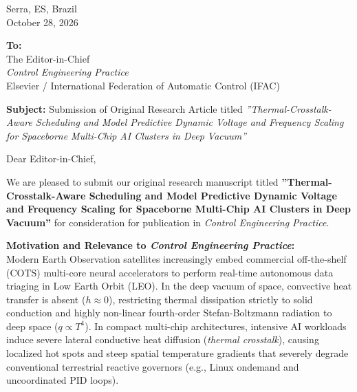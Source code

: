 \documentclass[11pt,a4paper]{article}
\begin{document}
\begin{flushright}
Serra, ES, Brazil \\
October 28, 2026
\end{flushright}

\textbf{To:} \\
The Editor-in-Chief \\
\textit{Control Engineering Practice} \\
Elsevier / International Federation of Automatic Control (IFAC)

\vspace{0.4cm}
\textbf{Subject:} Submission of Original Research Article titled \textit{''Thermal-Crosstalk-Aware Scheduling and Model Predictive Dynamic Voltage and Frequency Scaling for Spaceborne Multi-Chip AI Clusters in Deep Vacuum''}

Dear Editor-in-Chief,

We are pleased to submit our original research manuscript titled \textbf{''Thermal-Crosstalk-Aware Scheduling and Model Predictive Dynamic Voltage and Frequency Scaling for Spaceborne Multi-Chip AI Clusters in Deep Vacuum''} for consideration for publication in \textit{Control Engineering Practice}.

\textbf{Motivation and Relevance to \textit{Control Engineering Practice}:} \\
Modern Earth Observation satellites increasingly embed commercial off-the-shelf (COTS) multi-core neural accelerators to perform real-time autonomous data triaging in Low Earth Orbit (LEO). In the deep vacuum of space, convective heat transfer is absent ($h \approx 0$), restricting thermal dissipation strictly to solid conduction and highly non-linear fourth-order Stefan-Boltzmann radiation to deep space ($q \propto T^4$). In compact multi-chip architectures, intensive AI workloads induce severe lateral conductive heat diffusion (\textit{thermal crosstalk}), causing localized hot spots and steep spatial temperature gradients that severely degrade conventional terrestrial reactive governors (e.g., Linux ondemand and uncoordinated PID loops).
\end{document}

